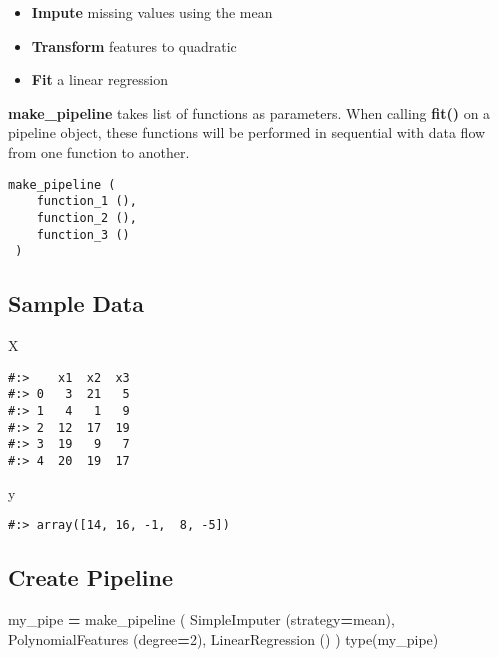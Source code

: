 \documentclass[
]{book}
\newenvironment{Shaded}{\begin{snugshade}}{\end{snugshade}}
\newcommand{\BuiltInTok}[1]{#1}
\newcommand{\DecValTok}[1]{\textcolor[rgb]{0.06,0.06,0.06}{#1}}
\newcommand{\NormalTok}[1]{#1}
\newcommand{\OperatorTok}[1]{\textcolor[rgb]{0.43,0.43,0.43}{\textbf{#1}}}
\newcommand{\StringTok}[1]{\textcolor[rgb]{0.5,0.5,0.5}{#1}}
\providecommand{\tightlist}{%
  \setlength{\itemsep}{0pt}\setlength{\parskip}{0pt}}
\begin{document}
\begin{itemize}
\tightlist
\item
  \textbf{Impute} missing values using the mean\\
\item
  \textbf{Transform} features to quadratic\\
\item
  \textbf{Fit} a linear regression
\end{itemize}

\textbf{make\_pipeline} takes list of functions as parameters. When calling \textbf{fit()} on a pipeline object, these functions will be performed in sequential with data flow from one function to another.

\begin{verbatim}
make_pipeline (
    function_1 (),
    function_2 (),
    function_3 ()
 )
\end{verbatim}

\hypertarget{sample-data-25}{%
\subsection{Sample Data}\label{sample-data-25}}

\begin{Shaded}
\begin{Highlighting}[]
\NormalTok{X}
\end{Highlighting}
\end{Shaded}

\begin{verbatim}
#:>    x1  x2  x3
#:> 0   3  21   5
#:> 1   4   1   9
#:> 2  12  17  19
#:> 3  19   9   7
#:> 4  20  19  17
\end{verbatim}

\begin{Shaded}
\begin{Highlighting}[]
\NormalTok{y}
\end{Highlighting}
\end{Shaded}

\begin{verbatim}
#:> array([14, 16, -1,  8, -5])
\end{verbatim}

\hypertarget{create-pipeline}{%
\subsection{Create Pipeline}\label{create-pipeline}}

\begin{Shaded}
\begin{Highlighting}[]
\NormalTok{my\_pipe }\OperatorTok{=}\NormalTok{ make\_pipeline (}
\NormalTok{    SimpleImputer            (strategy}\OperatorTok{=}\StringTok{\textquotesingle{}mean\textquotesingle{}}\NormalTok{),}
\NormalTok{    PolynomialFeatures (degree}\OperatorTok{=}\DecValTok{2}\NormalTok{),}
\NormalTok{    LinearRegression   ()}
\NormalTok{)}
\BuiltInTok{type}\NormalTok{(my\_pipe)}
\end{Highlighting}
\end{Shaded}
\end{document}
